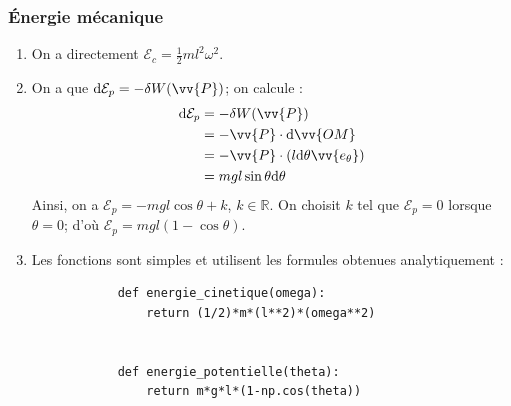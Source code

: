 \documentclass[17pt]{article}
\def\R{\mathbb R}
\begin{document}
	\subsubsection*{Énergie mécanique}
	\begin{enumerate}[start=13]
		\item On a directement $\boxed{\mathcal{E}_c=\frac12ml^2\omega^2}$.
		\item On a que $\dd \mathcal{E}_p=-\delta W(\vv{P})$; on calcule : 
		\begin{align*}
			\dd \mathcal{E}_p   &= -\delta W(\vv{P})\\
								&= -\vv{P}\cdot \dd\vv{OM}\\
								&= -\vv{P}\cdot(l\dd\theta\vv{e_\theta})\\
								&= mgl\sin\theta\dd\theta
		\end{align*}
		Ainsi, on a $\mathcal{E}_p=-mgl\cos\theta+k$, $k\in\R$. On choisit $k$ tel que $\mathcal{E}_p=0$ lorsque $\theta=0$; d'où $\boxed{\mathcal{E}_p=mgl(1-\cos\theta)}$.
		\item Les fonctions sont simples et utilisent les formules obtenues analytiquement : 
		\begin{lstlisting}
			def energie_cinetique(omega):
			    return (1/2)*m*(l**2)*(omega**2)


			def energie_potentielle(theta):
			    return m*g*l*(1-np.cos(theta))



\end{lstlisting}
\end{enumerate}
\end{document}
